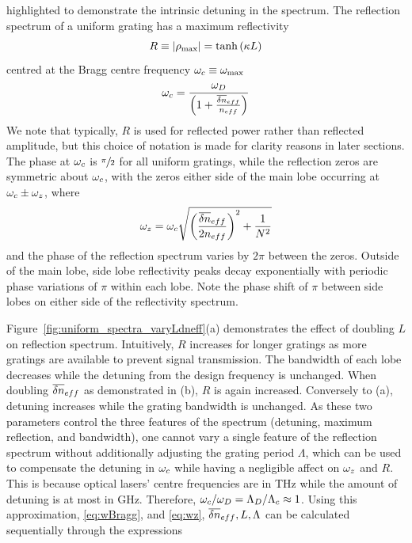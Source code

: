 %
highlighted to demonstrate the intrinsic detuning in the spectrum. The reflection spectrum of a uniform grating has a maximum reflectivity 
%
\begin{equation}
\label{eq:rmax}
    R \equiv |\rho_\text{max}| = \tanh{(\kappa L)}
\end{equation}
%
centred at the Bragg centre frequency $\omega_c \equiv \omega_\text{max}$
%
\begin{equation}
\label{eq:wBragg}
    \omega_c = \frac{\omega_D}{\left( 1 + \frac{\overline{\delta n}_{eff} }{n_{eff}}\right)}
\end{equation}
%
We note that typically, $R$ is used for reflected power rather than reflected amplitude, but this choice of notation is made for clarity reasons in later sections. 
The phase at $\omega_c$ is $\sfrac{\pi}{2}$ for all uniform gratings, while the reflection zeros are symmetric about $\omega_c$, with the zeros either side of the main lobe occurring at $\omega_c \pm \omega_z$, where
%
\begin{equation}
\label{eq:wz}
    \omega_z = \omega_c \sqrt{\left( \frac{\overline{\delta n}_{eff}}{2 n_{eff}} \right)^2 + \frac{1}{N^2} }
\end{equation}
%
and the phase of the reflection spectrum varies by $2 \pi$ between the zeros. Outside of the main lobe, side lobe reflectivity peaks decay exponentially with periodic phase variations of $\pi$ within each lobe. 
Note the phase shift of $\pi$ between side lobes on either side of the reflectivity spectrum.
%
\par
%
Figure~\ref{fig:uniform_spectra_varyLdneff}(a) demonstrates the effect of doubling $L$ on reflection spectrum. 
Intuitively, $R$ increases for longer gratings as more gratings are available to prevent signal transmission. 
The bandwidth of each lobe decreases while the detuning from the design frequency is unchanged. When doubling $\overline{\delta n}_{eff}$ as demonstrated in (b), $R$ is again increased. 
Conversely to (a), detuning increases while the grating bandwidth is unchanged. As these two parameters control the three features of the spectrum (detuning, maximum reflection, and bandwidth), 
one cannot vary a single feature of the reflection spectrum without additionally adjusting the grating period $\Lambda$, which can be used to compensate the detuning in $\omega_c$ while having a negligible affect on $\omega_z$ and $R$. 
This is because optical lasers' centre frequencies are in THz while the amount of detuning is at most in GHz. Therefore, $\omega_c/\omega_D = \Lambda_D/\Lambda_c \approx 1$. 
Using this approximation, \eqref{eq:wBragg}, and \eqref{eq:wz}, $\overline{\delta n}_{eff}, L, \Lambda$ can be calculated sequentially through the expressions
